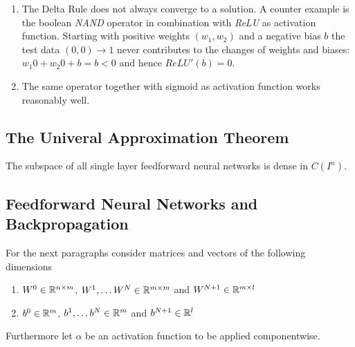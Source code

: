 \inputminted[fontsize=\small, framesep=0.35cm, frame=lines, python3=true]{python}{../notebook/neural_network/delta_rule.py}
\bigskip


\begin{examples}
    \hfill
    \begin{enumerate}
        \item The Delta Rule does not always converge to a solution. A counter example is the boolean \emph{NAND}
              operator in combination with \emph{ReLU} as activation function. Starting with positive weights
              \( (w_1, w_2) \) and a negative bias \( b \) the test data \( (0, 0) \to 1 \)
              never contributes to the changes of weights and biases: \( w_1 0 + w_2 0 + b = b < 0 \) and
              hence \( ReLU'(b) = 0 \).
        \item The same operator together with sigmoid as activation function works reasonably well.
    \end{enumerate}
\end{examples}
\bigskip


\subsection{The Univeral Approximation Theorem}
\bigskip

\begin{theorem}\label{thm:universal_approximation}
    The subspace of all single layer feedforward neural networks is dense in \( C(I^n) \).
\end{theorem}
\bigskip


\subsection{Feedforward Neural Networks and Backpropagation}

For the next paragraphs consider matrices and vectors of the following dimensions
\begin{enumerate}
    \item \( W^0 \in \mathbb{R}^{n \times{} m} \), \( W^1, \dots W^N \in \mathbb{R}^{m \times{} m} \) and \( W^{N + 1} \in \mathbb{R}^{m \times l} \)
    \item \( b^0 \in \mathbb{R}^m \), \( b^1, \dots b^N \in \mathbb{R}^m \) and \( b^{N + 1} \in \mathbb{R}^l \)
\end{enumerate}
Furthermore let \( \alpha \) be an activation function to be applied componentwise.
\bigskip

